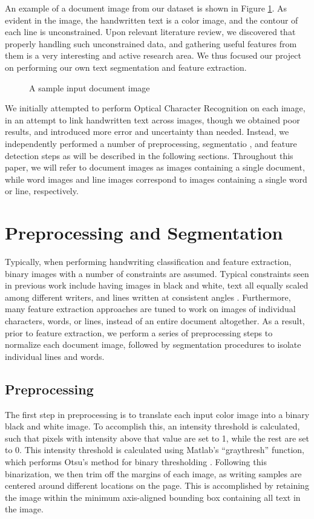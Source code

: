\documentclass[paper=a4, fontsize=11pt]{scrartcl} %
\numberwithin{equation}{section} %
\numberwithin{figure}{section} %
\numberwithin{table}{section} %
\begin{document}
An example of a document image from our dataset is shown in Figure
\ref{fig:docImage}. As evident in the image, the handwritten text is a
color image, and the contour of each line is unconstrained. Upon
relevant literature review, we discovered that properly handling such
unconstrained data, and gathering useful features from them is a very
interesting and active research area. We thus focused our project on
performing our own text segmentation and feature extraction.


\begin{figure}
  \centering {}
  \caption{A sample input document image}
  \label{fig:docImage}
\end{figure}

We initially attempted to perform Optical Character Recognition on
each image, in an attempt to link handwritten text across images,
though we obtained poor results, and introduced more error and
uncertainty than needed. Instead, we independently performed a number
of preprocessing, segmentatio , and feature detection steps as will be
described in the following sections. Throughout this paper, we will
refer to document images as images containing a single document, while
word images and line images correspond to images containing a single
word or line, respectively.

\section{Preprocessing and Segmentation}
\label{sec:pands}
Typically, when performing handwriting classification and feature
extraction, binary images with a number of constraints are
assumed. Typical constraints seen in previous work include having
images in black and white, text all equally scaled among different
writers, and lines written at consistent angles
\cite{Preprocessing}. Furthermore, many feature extraction approaches
are tuned to work on images of individual characters, words, or lines,
instead of an entire document altogether. As a result, prior to
feature extraction, we perform a series of preprocessing steps to
normalize each document image, followed by segmentation procedures to
isolate individual lines and words.

\subsection{Preprocessing}
The first step in preprocessing is to translate each input color image
into a binary black and white image. To accomplish this, an intensity
threshold is calculated, such that pixels with intensity above that
value are set to 1, while the rest are set to 0. This intensity
threshold is calculated using Matlab's ``graythresh'' function, which
performs Otsu's method for binary thresholding
\cite{ThresholdSelection}. Following this binarization, we then trim
off the margins of each image, as writing samples are centered around
different locations on the page. This is accomplished by retaining the
image within the minimum axis-aligned bounding box containing all text
in the image.
\end{document}
